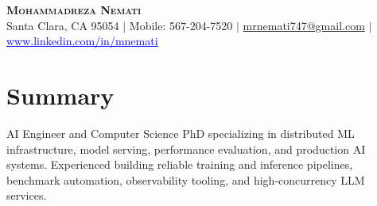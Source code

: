 \documentclass[letterpaper,13pt]{article}
\begin{document}
\begin{center}
    \textbf{\LARGE \scshape Mohammadreza Nemati} \\ \vspace{1pt}
    \small Santa Clara, CA 95054 $|$ Mobile: 567-204-7520 $|$
    \href{mailto:mrnemati747@gmail.com}{mrnemati747@gmail.com} $|$
    \href{https://www.linkedin.com/in/mnemati/}{\textcolor{blue}{\underline{www.linkedin.com/in/mnemati}}}
\end{center}

\section{Summary}
\small{AI Engineer and Computer Science PhD specializing in distributed ML infrastructure, model serving, performance evaluation, and production AI systems. Experienced building reliable training and inference pipelines, benchmark automation, observability tooling, and high-concurrency LLM services.}
\vspace{0.05cm}
\end{document}
